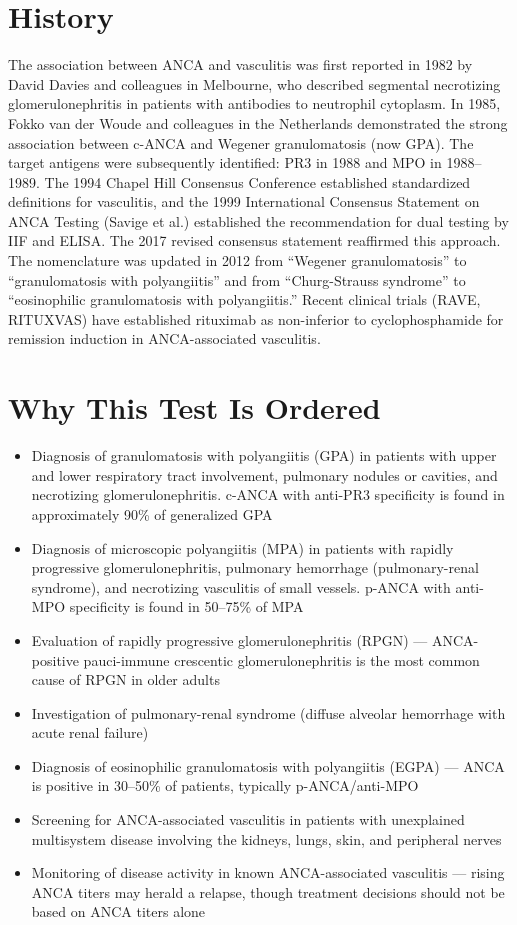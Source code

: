 \section*{History}
The association between ANCA and vasculitis was first reported in 1982 by David Davies and colleagues in Melbourne, who described segmental necrotizing glomerulonephritis in patients with antibodies to neutrophil cytoplasm. In 1985, Fokko van der Woude and colleagues in the Netherlands demonstrated the strong association between c-ANCA and Wegener granulomatosis (now GPA). The target antigens were subsequently identified: PR3 in 1988 and MPO in 1988--1989. The 1994 Chapel Hill Consensus Conference established standardized definitions for vasculitis, and the 1999 International Consensus Statement on ANCA Testing (Savige et al.) established the recommendation for dual testing by IIF and ELISA. The 2017 revised consensus statement reaffirmed this approach. The nomenclature was updated in 2012 from ``Wegener granulomatosis'' to ``granulomatosis with polyangiitis'' and from ``Churg-Strauss syndrome'' to ``eosinophilic granulomatosis with polyangiitis.'' Recent clinical trials (RAVE, RITUXVAS) have established rituximab as non-inferior to cyclophosphamide for remission induction in ANCA-associated vasculitis.

\section*{Why This Test Is Ordered}
\begin{itemize}
  \item Diagnosis of granulomatosis with polyangiitis (GPA) in patients with upper and lower respiratory tract involvement, pulmonary nodules or cavities, and necrotizing glomerulonephritis. c-ANCA with anti-PR3 specificity is found in approximately 90\% of generalized GPA
  \item Diagnosis of microscopic polyangiitis (MPA) in patients with rapidly progressive glomerulonephritis, pulmonary hemorrhage (pulmonary-renal syndrome), and necrotizing vasculitis of small vessels. p-ANCA with anti-MPO specificity is found in 50--75\% of MPA
  \item Evaluation of rapidly progressive glomerulonephritis (RPGN) --- ANCA-positive pauci-immune crescentic glomerulonephritis is the most common cause of RPGN in older adults
  \item Investigation of pulmonary-renal syndrome (diffuse alveolar hemorrhage with acute renal failure)
  \item Diagnosis of eosinophilic granulomatosis with polyangiitis (EGPA) --- ANCA is positive in 30--50\% of patients, typically p-ANCA/anti-MPO
  \item Screening for ANCA-associated vasculitis in patients with unexplained multisystem disease involving the kidneys, lungs, skin, and peripheral nerves
  \item Monitoring of disease activity in known ANCA-associated vasculitis --- rising ANCA titers may herald a relapse, though treatment decisions should not be based on ANCA titers alone
\end{itemize}

